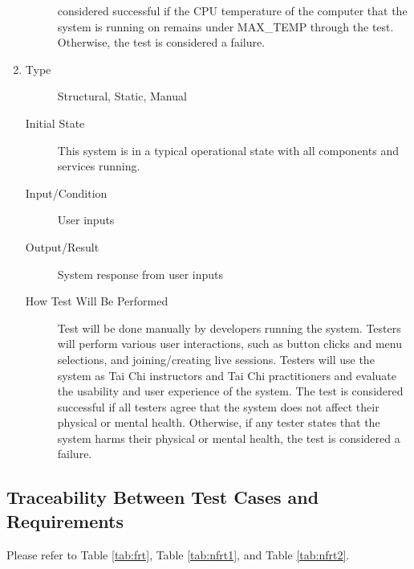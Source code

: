 \documentclass[12pt, titlepage]{article}
\begin{document}
\begin{enumerate}[NFR-T1]
\begin{description}
    considered successful if the CPU temperature of the computer that the system
    is running on remains under MAX\_TEMP through the test. Otherwise,
    the test is considered a failure.
  \end{description}
\item \label{NFRT30}
  \begin{description}
  \item[Type] Structural, Static, Manual
  \item[Initial State] This system is in a typical operational state with all
    components and services running.
  \item[Input/Condition] User inputs
  \item[Output/Result] System response from user inputs
  \item[How Test Will Be Performed] Test will be done manually by developers
    running the system. Testers will perform various user interactions, such as
    button clicks and menu selections, and joining/creating live sessions.
    Testers will use the system as Tai Chi instructors and Tai Chi practitioners
    and evaluate the usability and user experience of the system. The test is
    considered successful if all testers agree that the system does not affect
    their physical or mental health. Otherwise, if any tester states that the
    system harms their physical or mental health, the test is considered a
    failure.
  \end{description}
\end{enumerate}

\subsection{Traceability Between Test Cases and Requirements}

Please refer to Table \ref{tab:frt}, Table \ref{tab:nfrt1}, and Table \ref{tab:nfrt2}.
\end{document}
